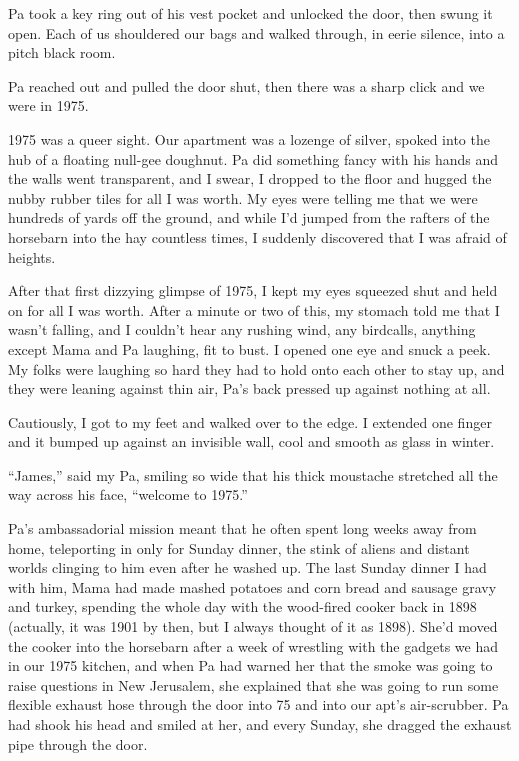 Pa took a key ring out of his vest pocket and unlocked the door,
then swung it open. Each of us shouldered our bags and walked
through, in eerie silence, into a pitch black room.

Pa reached out and pulled the door shut, then there was a sharp
click and we were in 1975.

\tb

1975 was a queer sight. Our apartment was a lozenge of silver,
spoked into the hub of a floating null-gee doughnut. Pa did
something fancy with his hands and the walls went transparent, and
I swear, I dropped to the floor and hugged the nubby rubber tiles
for all I was worth. My eyes were telling me that we were hundreds
of yards off the ground, and while I'd jumped from the rafters of
the horsebarn into the hay countless times, I suddenly discovered
that I was afraid of heights.

After that first dizzying glimpse of 1975, I kept my eyes squeezed
shut and held on for all I was worth. After a minute or two of
this, my stomach told me that I wasn't falling, and I couldn't hear
any rushing wind, any birdcalls, anything except Mama and Pa
laughing, fit to bust. I opened one eye and snuck a peek. My folks
were laughing so hard they had to hold onto each other to stay up,
and they were leaning against thin air, Pa's back pressed up
against nothing at all.

Cautiously, I got to my feet and walked over to the edge. I
extended one finger and it bumped up against an invisible wall,
cool and smooth as glass in winter.

``James,'' said my Pa, smiling so wide that his thick moustache
stretched all the way across his face, ``welcome to 1975.''

\tb

Pa's ambassadorial mission meant that he often spent long weeks
away from home, teleporting in only for Sunday dinner, the stink of
aliens and distant worlds clinging to him even after he washed up.
The last Sunday dinner I had with him, Mama had made mashed
potatoes and corn bread and sausage gravy and turkey, spending the
whole day with the wood-fired cooker back in 1898 (actually, it was
1901 by then, but I always thought of it as 1898). She'd moved the
cooker into the horsebarn after a week of wrestling with the
gadgets we had in our 1975 kitchen, and when Pa had warned her that
the smoke was going to raise questions in New Jerusalem, she
explained that she was going to run some flexible exhaust hose
through the door into 75 and into our apt's air-scrubber. Pa had
shook his head and smiled at her, and every Sunday, she dragged the
exhaust pipe through the door.

